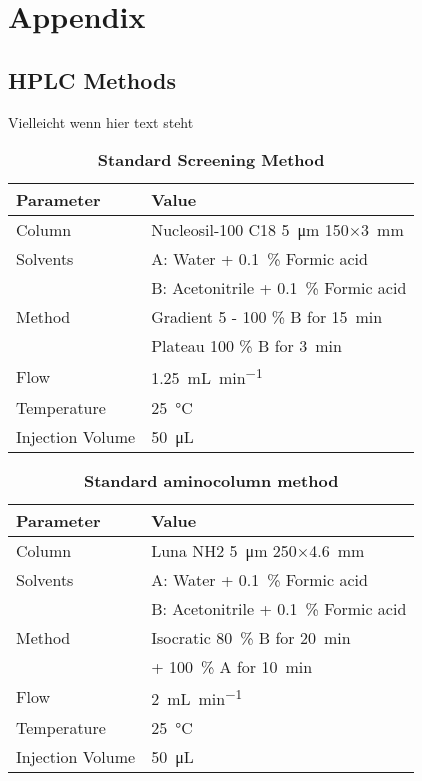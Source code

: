 
\chapter{Appendix}

\section*{HPLC Methods} %
\label{sec:hplc_methods}

	Vielleicht wenn hier text steht

	\begin{table}[htbp]
		\caption[Standard aminocolumn method]{\textbf{Standard Screening Method}}
		\label{tab:method_c18_screening}
		\centering
		\begin{tabularx}{\textwidth}{XX}
			\toprule
			\textbf{Parameter}	& \textbf{Value}	\\
			\midrule
			Column 		& Nucleosil-100 C18 \SI{5}{\micro\meter} 150$\times$\SI{3}{\milli\meter} 	\\
			Solvents	& A: Water + 0.1~\% Formic acid 	\\
						& B: Acetonitrile + 0.1~\% Formic acid		\\
			Method 		& Gradient 5 - 100 \% B for \SI{15}{\minute} 	\\
						& Plateau 100 \% B for \SI{3}{\minute} 	\\
			Flow 		& \SI{1.25}{\milli\liter\per\minute} \\
			Temperature & \SI{25}{\celsius} 	\\
			Injection Volume 	& \SI{50}{\micro\liter} 	\\
			\bottomrule
		\end{tabularx}
	\end{table}

	\begin{table}[htbp]
		\caption[Standard aminocolumn method]{\textbf{Standard aminocolumn method}}
		\label{tab:method_nh2_standard}
		\centering
		\begin{tabularx}{\textwidth}{XX}
			\toprule
			\textbf{Parameter}	& \textbf{Value}	\\
			\midrule
			Column 		& Luna NH2 \SI{5}{\micro\meter} 250$\times$\SI{4.6}{\milli\meter} 	\\
			Solvents	& A: Water + 0.1~\% Formic acid 	\\
						& B: Acetonitrile + 0.1~\% Formic acid		\\
			Method 		& Isocratic 80~\% B for \SI{20}{\minute} 	\\
						& + 100~\% A for \SI{10}{\minute}   \\
			Flow 		& \SI{2}{\milli\liter\per\minute} \\
			Temperature & \SI{25}{\celsius} 	\\
			Injection Volume 	& \SI{50}{\micro\liter} 	\\
			\bottomrule
		\end{tabularx}
	\end{table}

